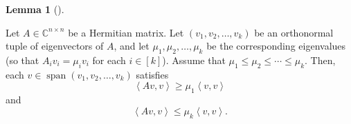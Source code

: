 \documentclass[numbers=enddot,12pt,final,onecolumn,notitlepage]{scrartcl}%
\numberwithin{exer}{subsection}
\theoremstyle{definition}
\newtheorem{lem}[theo]{Lemma}
\newenvironment{lemma}[1][]
{\begin{lem}[#1]\begin{leftbar}}
{\end{leftbar}\end{lem}}
\begin{document}
\begin{lemma}
\label{lem.herm.cour-fish-lem}Let $A\in\mathbb{C}^{n\times n}$ be a Hermitian
matrix. Let $\left(  v_{1},v_{2},\ldots,v_{k}\right)  $ be an orthonormal
tuple of eigenvectors of $A$, and let $\mu_{1},\mu_{2},\ldots,\mu_{k}$ be the
corresponding eigenvalues (so that $A_{i}v_{i}=\mu_{i}v_{i}$ for each
$i\in\left[  k\right]  $). Assume that $\mu_{1}\leq\mu_{2}\leq\cdots\leq
\mu_{k}$. Then, each $v\in\operatorname*{span}\left(  v_{1},v_{2},\ldots
,v_{k}\right)  $ satisfies%
\begin{equation}
\left\langle Av,v\right\rangle \geq\mu_{1}\left\langle v,v\right\rangle
\label{eq.lem.herm.cour-fish-lem.geq}%
\end{equation}
and%
\begin{equation}
\left\langle Av,v\right\rangle \leq\mu_{k}\left\langle v,v\right\rangle .
\label{eq.lem.herm.cour-fish-lem.leq}%
\end{equation}

\end{lemma}
\end{document}
